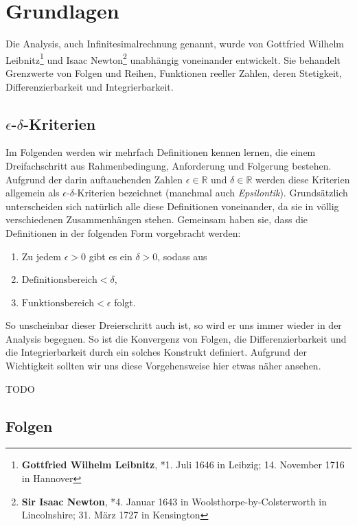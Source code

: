 
\chapter{Grundlagen}

Die Analysis, auch Infinitesimalrechnung genannt, wurde von Gottfried Wilhelm Leibnitz\footnote{\textbf{Gottfried Wilhelm Leibnitz}, *1. Juli 1646 in Leibzig; 14. November 1716 in Hannover} und Isaac Newton\footnote{\textbf{Sir Isaac Newton}, *4. Januar 1643 in Woolsthorpe-by-Colsterworth in Lincolnshire; 31. März 1727 in Kensington} unabhängig voneinander entwickelt. Sie behandelt Grenzwerte von Folgen und Reihen, Funktionen reeller Zahlen, deren Stetigkeit, Differenzierbarkeit und Integrierbarkeit. 

\section{$\epsilon$-$\delta$-Kriterien}

Im Folgenden werden wir mehrfach Definitionen kennen lernen, die einem Dreifachschritt aus Rahmenbedingung, Anforderung und Folgerung bestehen. Aufgrund der darin auftauchenden Zahlen $\epsilon\in \mathbb{R}$ und $\delta\in\mathbb{R}$ werden diese Kriterien allgemein als $\epsilon$-$\delta$-Kriterien bezeichnet (manchmal auch \emph{Epsilontik}). Grundsätzlich unterscheiden sich natürlich alle diese Definitionen voneinander, da sie in völlig verschiedenen Zusammenhängen stehen. Gemeinsam haben sie, dass die Definitionen in der folgenden Form vorgebracht werden:

\begin{enumerate}
\item Zu jedem $\epsilon>0$ gibt es ein $\delta>0$, sodass aus
\item $\text{Definitionsbereich} < \delta$,
\item $\text{Funktionsbereich} < \epsilon$ folgt.
\end{enumerate}

So unscheinbar dieser Dreierschritt auch ist, so wird er uns immer wieder in der Analysis begegnen. So ist die Konvergenz von Folgen, die Differenzierbarkeit und die Integrierbarkeit durch ein solches Konstrukt definiert. Aufgrund der Wichtigkeit sollten wir uns diese Vorgehensweise hier etwas näher ansehen.

TODO


\section{Folgen}

